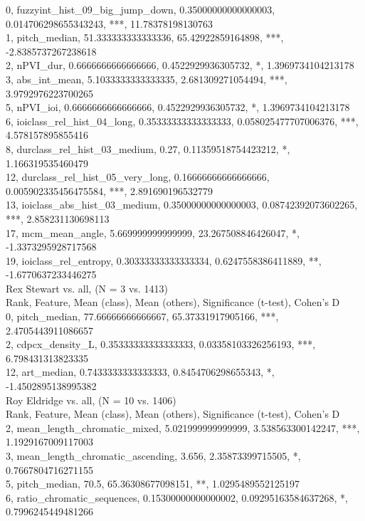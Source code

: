 0, fuzzyint_hist_09_big_jump_down, 0.35000000000000003, 0.014706298655343243, ***, 11.78378198130763\\
1, pitch_median, 51.333333333333336, 65.42922859164898, ***, -2.8385737267238618\\
2, nPVI_dur, 0.6666666666666666, 0.4522929936305732, *, 1.3969734104213178\\
3, abs_int_mean, 5.1033333333333335, 2.681309271054494, ***, 3.9792976223700265\\
5, nPVI_ioi, 0.6666666666666666, 0.4522929936305732, *, 1.3969734104213178\\
6, ioiclass_rel_hist_04_long, 0.35333333333333333, 0.058025477707006376, ***, 4.578157895855416\\
8, durclass_rel_hist_03_medium, 0.27, 0.11359518754423212, *, 1.166319535460479\\
12, durclass_rel_hist_05_very_long, 0.16666666666666666, 0.005902335456475584, ***, 2.891690196532779\\
13, ioiclass_abs_hist_03_medium, 0.35000000000000003, 0.08742392073602265, ***, 2.858231130698113\\
17, mcm_mean_angle, 5.669999999999999, 23.267508846426047, *, -1.3373295928717568\\
19, ioiclass_rel_entropy, 0.30333333333333334, 0.6247558386411889, **, -1.6770637233446275\\
Rex Stewart vs. all, (N = 3 vs. 1413)\\
Rank, Feature, Mean (class), Mean (others), Significance (t-test), Cohen's D\\
0, pitch_median, 77.66666666666667, 65.37331917905166, ***, 2.4705443911086657\\
2, cdpcx_density_L, 0.35333333333333333, 0.03358103326256193, ***, 6.798431313823335\\
12, art_median, 0.7433333333333333, 0.8454706298655343, *, -1.4502895138995382\\
Roy Eldridge vs. all, (N = 10 vs. 1406)\\
Rank, Feature, Mean (class), Mean (others), Significance (t-test), Cohen's D\\
2, mean_length_chromatic_mixed, 5.021999999999999, 3.538563300142247, ***, 1.1929167009117003\\
3, mean_length_chromatic_ascending, 3.656, 2.35873399715505, *, 0.7667804716271155\\
5, pitch_median, 70.5, 65.36308677098151, **, 1.0295489552125197\\
6, ratio_chromatic_sequences, 0.15300000000000002, 0.09295163584637268, *, 0.7996245449481266\\

